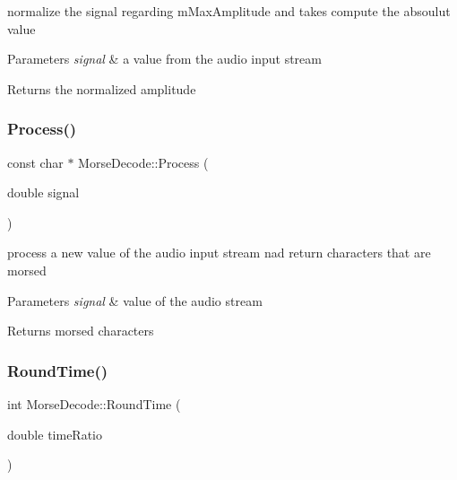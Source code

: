 normalize the signal regarding m\+Max\+Amplitude and takes compute the absoulut value 


\begin{DoxyParams}{Parameters}
{\em signal} & a value from the audio input stream \\
\hline
\end{DoxyParams}
\begin{DoxyReturn}{Returns}
the normalized amplitude 
\end{DoxyReturn}
\mbox{\label{classMorseDecode_a9db5d2a826a6795f8a18cf123604d5a9}} 
\subsubsection{\texorpdfstring{Process()}{Process()}}
{\footnotesize\ttfamily const char $\ast$ Morse\+Decode\+::\+Process (\begin{DoxyParamCaption}\item[{double}]{signal }\end{DoxyParamCaption})}



process a new value of the audio input stream nad return characters that are morsed 


\begin{DoxyParams}{Parameters}
{\em signal} & value of the audio stream \\
\hline
\end{DoxyParams}
\begin{DoxyReturn}{Returns}
morsed characters 
\end{DoxyReturn}
\mbox{\label{classMorseDecode_ad1f577a49ff5d8f4face188dba8966c7}} 
\subsubsection{\texorpdfstring{Round\+Time()}{RoundTime()}}
{\footnotesize\ttfamily int Morse\+Decode\+::\+Round\+Time (\begin{DoxyParamCaption}\item[{double}]{time\+Ratio }\end{DoxyParamCaption})\hspace{0.3cm}{\ttfamily [private]}}



